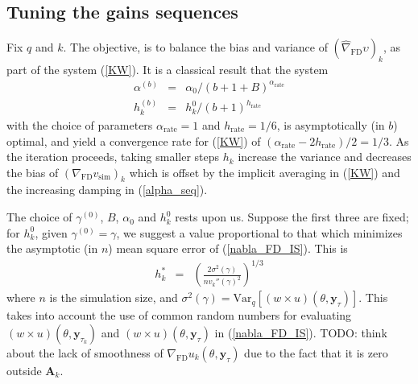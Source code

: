 \documentclass{article}
\begin{document}

\subsection{Tuning the gains sequences}
Fix $q$ and $k$. The objective, is to balance the bias and variance
of $(\widehat{\nabla}_{\mathrm{\scriptscriptstyle FD}} \upsilon)_k$,
as part of the system (\ref{KW}). It is a classical result that the
system
\begin{eqnarray}\label{alpha_seq}
\alpha^{(b)}&=& \alpha_0/(b+1+B)^{\alpha_{\mathrm{
\scriptscriptstyle rate}}}\\\label{h_seq} h_k^{(b)}&=&
h_k^{0}/(b+1)^{h_{\mathrm{\scriptscriptstyle rate}}}
\end{eqnarray}with the choice of parameters $\alpha_{\mathrm{\scriptscriptstyle rate}}=1$ and
$h_{\mathrm{\scriptscriptstyle rate}}=1/6$, is asymptotically (in
$b$) optimal, and yield a convergence rate for (\ref{KW}) of
$(\alpha_{\mathrm{\scriptscriptstyle rate}}-2
h_{\mathrm{\scriptscriptstyle rate}})/2=1/3$. As the iteration
proceeds, taking smaller steps $h_k$ increase the variance and
decreases the bias of $(\nabla_{\mathrm{\scriptscriptstyle
FD}}v_{\mathrm{sim}})_k$ which is offset by the implicit averaging
in (\ref{KW}) and the increasing damping in (\ref{alpha_seq}).

The choice of $\gamma^{(0)}$, $B$, $\alpha_0$ and $h_k^{0}$ rests
upon us. Suppose the first three are fixed; for $h_k^0$, given
$\gamma^{(0)}=\gamma$, we suggest a value proportional to that which
minimizes the asymptotic (in $n$) mean square error of
(\ref{nabla_FD_IS}). This is
\begin{eqnarray}\label{h_opt} h_k^{*} &=&
\left(\frac{2 \sigma^2(\gamma)}{n v_{k}''(\gamma)^2}\right)^{1/3}
\end{eqnarray}where $n$ is the simulation size, and
$\sigma^2(\gamma)=\mathrm{Var}_{q}[(w\times
u)(\theta,\mathbf{y}_{\tau})]$.  This takes into account the use of
common random numbers for evaluating $(w\times
u)(\theta,\textbf{y}_{\tau_k})$ and $(w \times
u)(\theta,\textbf{y}_{\tau})$ in (\ref{nabla_FD_IS}). TODO: think
about the lack of smoothness of $\nabla_{\mathrm{FD}}
u_k(\theta,\mathbf{y}_{\tau})$ due to the fact that it is zero
outside $\mathbf{A}_k$.
\end{document}
